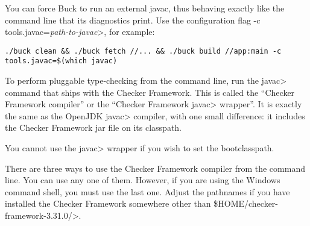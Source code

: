 You can force Buck to run an external javac, thus behaving exactly like the
command line that its diagnostics print.  Use the configuration flag \<-c
tools.javac=\emph{path-to-javac}>, for example:

\begin{Verbatim}
./buck clean && ./buck fetch //... && ./buck build //app:main -c tools.javac=$(which javac)
\end{Verbatim}


\label{javac-installation}      %

To perform pluggable type-checking from the command line, run the \<javac>
command that ships with the Checker Framework.  This is called the
``Checker Framework compiler'' or the ``Checker Framework \<javac> wrapper''.
It is exactly the same as the OpenJDK
\<javac> compiler, with one small difference:  it includes the Checker
Framework jar file on its classpath.

You cannot use the \<javac> wrapper if you wish to set the bootclasspath.

There are three ways to use the Checker Framework compiler from the command
line.  You can use any
one of them.  However, if you are using the Windows command shell, you must
use the last one.
Adjust the pathnames if you have installed the Checker Framework somewhere
other than \<\${HOME}/checker-framework-3.31.0/>.



